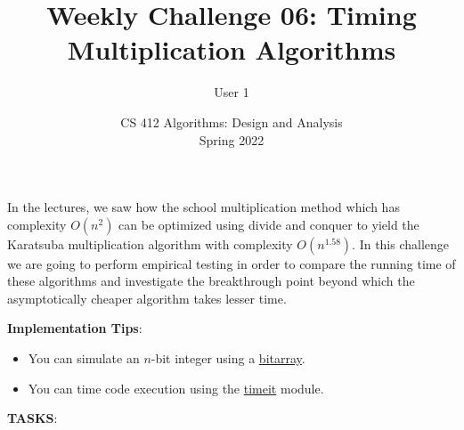\documentclass[a4paper]{exam}
\title{Weekly Challenge 06: Timing Multiplication Algorithms}
\author{User 1}  %
\date{CS 412 Algorithms: Design and Analysis\\Spring 2022}
\begin{document}
\maketitle

\begin{questions}
  
  \question In the lectures, we saw how the school multiplication method which has complexity $O(n^2)$ can be optimized using divide and conquer to yield the Karatsuba multiplication algorithm with complexity $O(n^{1.58})$. In this challenge we are going to perform empirical testing in order to compare the running time of these algorithms and investigate the breakthrough point beyond which the asymptotically cheaper algorithm takes lesser time.

  \textbf{Implementation Tips}:
  \begin{itemize}
  \item You can simulate an $n$-bit integer using a \href{https://www.pythonpool.com/python-bitarray/}{bitarray}.
  \item You can time code execution using the \href{https://docs.python.org/3/library/timeit.html}{timeit} module.
  \end{itemize}

  \textbf{TASKS}:
  
  \begin{solution}
  \end{solution}
\end{questions}
\end{document}
